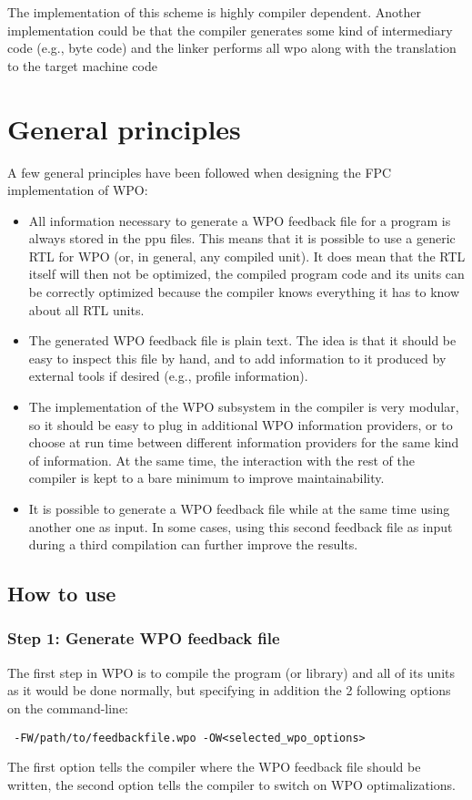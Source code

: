 The implementation of this scheme is highly compiler dependent. Another
implementation could be that the compiler generates some kind of intermediary 
code (e.g., byte code) and the linker performs all wpo along with the translation 
to the target machine code 
\section{General principles}
A few general principles have been followed when designing the FPC
implementation of WPO: 
\begin{itemize} 
\item All information necessary to generate a WPO feedback file for a program is
always stored in the ppu files. This means that it is possible to use a 
generic RTL for WPO (or, in general, any compiled unit). It does mean that 
the RTL itself will then not be optimized, the compiled program code and 
its units can be correctly optimized because the compiler knows everything 
it has to know about all RTL units.
\item The generated WPO feedback file is plain text. The idea is that it should
be easy to inspect this file by hand, and to add information to it produced
by external tools if desired (e.g., profile information).
\item The implementation of the WPO subsystem in the compiler is very modular, 
so it should be easy to plug in additional WPO information providers, or to
choose at run time between different information providers for the same kind
of information. At the same time, the interaction with the rest of the
compiler is kept to a bare minimum to improve maintainability.
\item It is possible to generate a WPO feedback file while at the same time using
another one as input. In some cases, using this second feedback file as
input during a third compilation can further improve the results. 
\end{itemize}

\subsection{How to use}
\subsubsection{Step 1: Generate WPO feedback file}
The first step in WPO is to compile the program (or library) and all of its 
units as it would be done normally, but specifying in addition the 2
following options on the command-line:
\begin{verbatim}
 -FW/path/to/feedbackfile.wpo -OW<selected_wpo_options>
\end{verbatim}
The first option tells the compiler where the WPO feedback file should be
written, the second option tells the compiler to switch on WPO
optimalizations.

